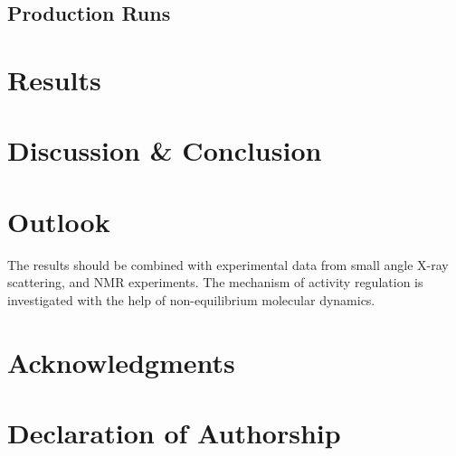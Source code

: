 \documentclass[english, a4paper, 12pt, titlepage, draft]{article}
\begin{document}
\subsection{Production Runs}



\section{Results}



\section{Discussion \& Conclusion}



\section{Outlook}
The results should be combined with experimental data from small angle X-ray scattering, and NMR experiments. The mechanism of activity regulation is investigated with the help of non-equilibrium molecular dynamics.



\section{Acknowledgments}


\section{Declaration of Authorship}

\newcommand{\declareAuthorship}[3][\today]{

    \noindent
    I, #3, hereby declare that I have created this work, excluding this
    declaration, completely on my own and used no other sources or tools
    than the ones listed, and that I have marked any citations accordingly.

    \begin{minipage}[c]{\textwidth}

        \vspace{2cm}

        \makebox[\textwidth][c]{
            \makebox[.4\textwidth][l] {\textrm{#2, #1}}
            \hfill
            \makebox[.4\textwidth][c] {\hrulefill}
            \hfill
        }
        \makebox[\textwidth][c]{
            \hfill
            \makebox[.4\textwidth][c] {}
            \emph{#3}
            \hfill
        }
        \vspace{1cm}
    \end{minipage}
}
\end{document}
